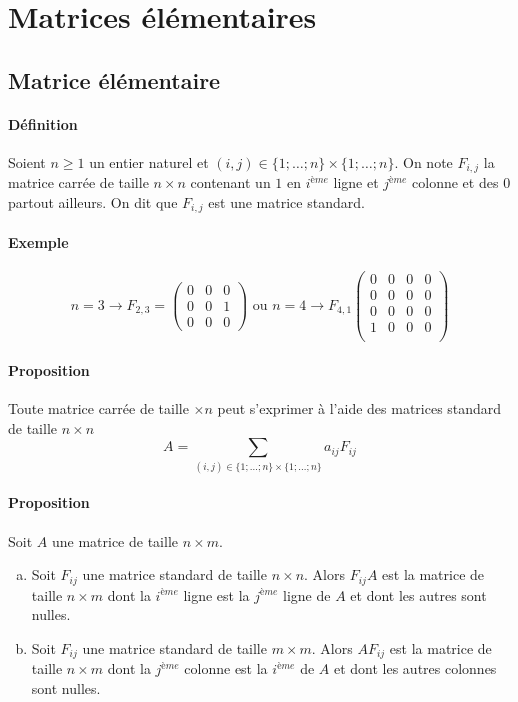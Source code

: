 %
%
\section{Matrices élémentaires}
%
%

%
\subsection{Matrice élémentaire}
%
\paragraph{Définition} Soient $n \geq 1$ un entier naturel et $(i, j) \in \{1; \ldots; n\} \times \{1; \ldots; n\}$. On note $F_{i, j}$ la matrice carrée de taille $n \times n$ contenant un $1$ en $i^{ème}$ ligne et $j^{ème}$ colonne et des $0$ partout ailleurs. On dit que $F_{i, j}$ est une matrice standard.

\paragraph{Exemple} $$n=3 \rightarrow F_{2,3}=\begin{pmatrix}0&0&0\\0&0&1\\0&0&0\end{pmatrix}\text{ ou  } n=4\rightarrow F_{4,1}\begin{pmatrix}0&0&0&0\\0&0&0&0\\0&0&0&0\\1&0&0&0\\\end{pmatrix}$$

\paragraph{Proposition} Toute matrice carrée de taille $\times n$ peut s'exprimer à l'aide des matrices standard de taille $n\times n$
$$A = \sum_{(i, j) \in \{1; \ldots; n\}\times\{1; \ldots; n\}} a_{ij} F_{ij}$$

\paragraph{Proposition} Soit $A$ une matrice de taille $n\times m$.
\begin{enumerate}[a)]
  \item Soit $F_{ij}$ une matrice standard de taille $n\times n$. Alors $F_{ij} A$ est la matrice de taille $n \times m$ dont la $i^{ème}$ ligne est la $j^{ème}$ ligne de $A$ et dont les autres sont nulles.
  \item Soit $F_{ij}$ une matrice standard de taille $m\times m$. Alors $A F_{ij}$ est la matrice de taille $n\times m$ dont la $j^{ème}$ colonne est la $i^{ème}$ de $A$ et dont les autres colonnes sont nulles.
\end{enumerate}

